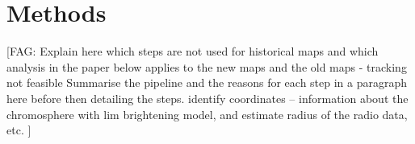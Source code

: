 \documentclass{aa}
\newcommand{\fag}[1]{\textcolor{midpurple}{[FAG: #1]}} %
\begin{document}
\section{Methods}\label{sect:methods}

\fag{Explain here which steps are not used for historical maps and which analysis in the paper below applies to the new maps and the old maps - tracking not feasible
Summarise the pipeline and the reasons for each step in a paragraph here before then detailing the steps.
identify coordinates -- information about the chromosphere with lim brightening
model, and estimate radius of the radio data, etc.
}
\end{document}
